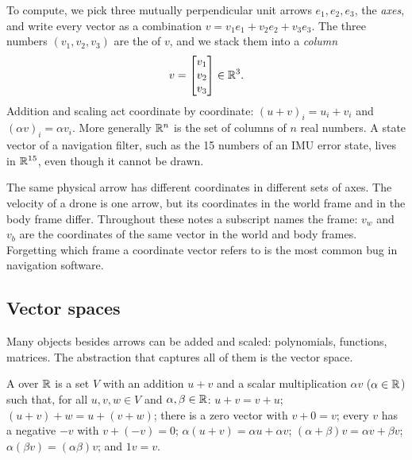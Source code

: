 To compute, we pick three mutually perpendicular unit arrows $e_1, e_2, e_3$, the \emph{axes}, and write every
vector as a combination $v = v_1e_1 + v_2e_2 + v_3e_3$. The three numbers $(v_1, v_2, v_3)$ are the
 of $v$, and we stack them into a \emph{column}
\begin{equation}
  v = \begin{bmatrix} v_1 \\ v_2 \\ v_3 \end{bmatrix} \in \mathbb{R}^3 .
\end{equation}
Addition and scaling act coordinate by coordinate: $(u + v)_i = u_i + v_i$ and $(\alpha v)_i = \alpha v_i$.
More generally $\mathbb{R}^n$ is the set of columns of $n$ real numbers. A state vector of a navigation filter, such as
the 15 numbers of an IMU error state, lives in $\mathbb{R}^{15}$, even though it cannot be drawn.

\begin{keyidea}
The same physical arrow has different coordinates in different sets of axes. The velocity of a drone is one
arrow, but its coordinates in the world frame and in the body frame differ. Throughout these notes a subscript
names the frame: $v_w$ and $v_b$ are the coordinates of the same vector in the world and body frames.
Forgetting which frame a coordinate vector refers to is the most common bug in navigation software.
\end{keyidea}

\subsection{Vector spaces}

Many objects besides arrows can be added and scaled: polynomials, functions, matrices. The abstraction that
captures all of them is the vector space.

\begin{definition}
A  over $\mathbb{R}$ is a set $V$ with an addition $u + v$ and a scalar multiplication $\alpha v$
($\alpha \in \mathbb{R}$) such that, for all $u, v, w \in V$ and $\alpha, \beta \in \mathbb{R}$:
$u + v = v + u$; $(u + v) + w = u + (v + w)$; there is a zero vector with $v + 0 = v$; every $v$ has a negative
$-v$ with $v + (-v) = 0$; $\alpha(u + v) = \alpha u + \alpha v$; $(\alpha + \beta)v = \alpha v + \beta v$;
$\alpha(\beta v) = (\alpha\beta)v$; and $1v = v$.
\end{definition}

